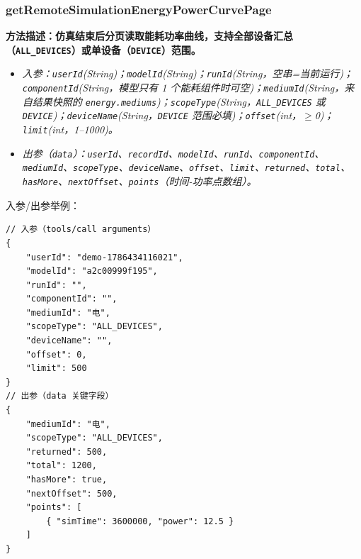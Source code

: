 \subsubsection{getRemoteSimulationEnergyPowerCurvePage}
\bf{方法描述}：仿真结束后分页读取能耗功率曲线，支持全部设备汇总（\texttt{ALL\_DEVICES}）或单设备（\texttt{DEVICE}）范围。
\begin{itemize}
	\item \it{入参}：\texttt{userId}(String)；\texttt{modelId}(String)；\texttt{runId}(String，空串=当前运行)；\texttt{componentId}(String，模型只有 1 个能耗组件时可空)；\texttt{mediumId}(String，来自结果快照的 \texttt{energy.mediums})；\texttt{scopeType}(String，\texttt{ALL\_DEVICES} 或 \texttt{DEVICE})；\texttt{deviceName}(String，\texttt{DEVICE} 范围必填)；\texttt{offset}(int，$\geq$0)；\texttt{limit}(int，1--1000)。
	\item \it{出参}（\texttt{data}）：\texttt{userId}、\texttt{recordId}、\texttt{modelId}、\texttt{runId}、\texttt{componentId}、\texttt{mediumId}、\texttt{scopeType}、\texttt{deviceName}、\texttt{offset}、\texttt{limit}、\texttt{returned}、\texttt{total}、\texttt{hasMore}、\texttt{nextOffset}、\texttt{points}（时间-功率点数组）。
\end{itemize}
入参/出参举例：
\begin{lstlisting}
// 入参（tools/call arguments）
{
    "userId": "demo-1786434116021",
    "modelId": "a2c00999f195",
    "runId": "",
    "componentId": "",
    "mediumId": "电",
    "scopeType": "ALL_DEVICES",
    "deviceName": "",
    "offset": 0,
    "limit": 500
}
// 出参（data 关键字段）
{
    "mediumId": "电",
    "scopeType": "ALL_DEVICES",
    "returned": 500,
    "total": 1200,
    "hasMore": true,
    "nextOffset": 500,
    "points": [
        { "simTime": 3600000, "power": 12.5 }
    ]
}
\end{lstlisting}\vspace{-30pt}

